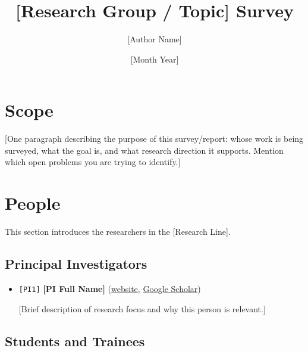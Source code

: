 \documentclass[10pt]{article}
\title{[Research Group / Topic] Survey}
\author{[Author Name]}
\date{[Month Year]}
\newcommand{\personcode}[1]{\textcolor{personpurple}{\texttt{[#1]}}}
\begin{document}
\maketitle
\tableofcontents
\newpage

\section{Scope}

[One paragraph describing the purpose of this survey/report: whose work
is being surveyed, what the goal is, and what research direction it
supports. Mention which open problems you are trying to identify.]

\section{People}

This section introduces the researchers in the [Research Line].

\subsection{Principal Investigators}

\begin{itemize}[leftmargin=*]

\item {}\label{person:PI1}\personcode{PI1}
\textbf{[PI Full Name]}
(\href{https://example.com}{website},
\href{https://scholar.google.com}{Google Scholar})

[Brief description of research focus and why this person is relevant.]

\end{itemize}

\subsection{Students and Trainees}
\end{document}
